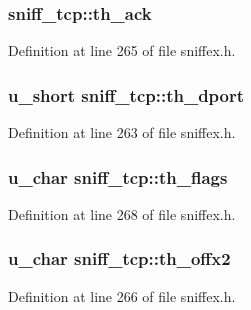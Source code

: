 \subsubsection[{\texorpdfstring{th\+\_\+ack}{th_ack}}]{ sniff\+\_\+tcp\+::th\+\_\+ack}\hypertarget{structsniff__tcp_a5d7e4a998411a138b50ca3950c172212}{}\label{structsniff__tcp_a5d7e4a998411a138b50ca3950c172212}


Definition at line 265 of file sniffex.\+h.

\subsubsection[{\texorpdfstring{th\+\_\+dport}{th_dport}}]{\setlength{\rightskip}{0pt plus 5cm}u\+\_\+short sniff\+\_\+tcp\+::th\+\_\+dport}\hypertarget{structsniff__tcp_a8e67681937de43161ed5eeecd01272d0}{}\label{structsniff__tcp_a8e67681937de43161ed5eeecd01272d0}


Definition at line 263 of file sniffex.\+h.

\subsubsection[{\texorpdfstring{th\+\_\+flags}{th_flags}}]{\setlength{\rightskip}{0pt plus 5cm}u\+\_\+char sniff\+\_\+tcp\+::th\+\_\+flags}\hypertarget{structsniff__tcp_aaec4001301328a04ff3e653f688d9c19}{}\label{structsniff__tcp_aaec4001301328a04ff3e653f688d9c19}


Definition at line 268 of file sniffex.\+h.

\subsubsection[{\texorpdfstring{th\+\_\+offx2}{th_offx2}}]{\setlength{\rightskip}{0pt plus 5cm}u\+\_\+char sniff\+\_\+tcp\+::th\+\_\+offx2}\hypertarget{structsniff__tcp_a96031b46089f404631f459c46b4a9eea}{}\label{structsniff__tcp_a96031b46089f404631f459c46b4a9eea}


Definition at line 266 of file sniffex.\+h.

